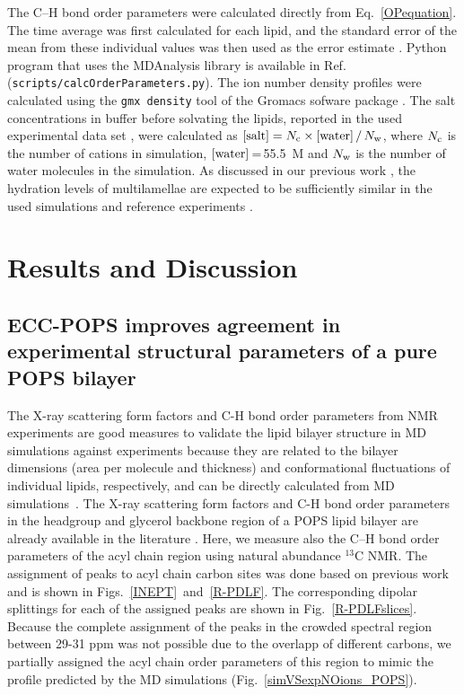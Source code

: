 \documentclass[journal=jpcbfk,manuscript=article]{achemso}
\begin{document}
The C--H bond order parameters were calculated directly from Eq.~\ref{OPequation}.
The time average was first calculated for each lipid, and
the standard error of the mean from these individual values was then used as the
error estimate \cite{botan15,ollila16,NMRlipidsIV}.
Python program that uses the
MDAnalysis library \cite{agrawal11,gowers16} is available in Ref.~ ({\tt scripts/calcOrderParameters.py}). 
The ion number density profiles were calculated using the {\tt gmx density} tool
of the Gromacs sofware package \cite{gromacsMANUAL}.
The salt concentrations in buffer before solvating the lipids, reported in the used experimental data set \cite{roux90},
were calculated as $[{\rm salt}]=N_{\rm c} \times[{\rm water}]\,/\,N_{\rm w}$,
where $N_{\rm c}$ is the number of cations in simulation, $[{\rm water}]$\,=\,55.5~M and $N_{\rm w}$
is the number of water molecules in the simulation.
As discussed in our previous work \cite{NMRlipidsIV}, the hydration levels of
multilamellae are expected to be sufficiently similar in the used simulations and reference experiments \cite{roux90}.


\section{Results and Discussion} 
 
\subsection{ECC-POPS improves agreement in experimental structural parameters of a pure POPS bilayer } 
 
The X-ray scattering form factors and C-H bond order parameters from NMR experiments are good measures to validate
the lipid bilayer structure in MD simulations against experiments because they
are related to the bilayer dimensions (area per molecule and thickness) and
conformational fluctuations of individual lipids, respectively, and 
can be directly calculated from MD simulations~\cite{ollila16}.
The X-ray scattering form factors and C-H bond order parameters in
the headgroup and glycerol backbone region of a POPS lipid bilayer are already available in the literature \cite{kucerka14,NMRlipidsIV}.
Here, we measure also the C--H bond order parameters of the acyl chain region using natural abundance $^{13}$C NMR.
The assignment of peaks to acyl chain carbon sites was done based on previous work {\cite{ferreira13}} and is shown in Figs.~\ref{INEPT}~and~\ref{R-PDLF}. The corresponding dipolar splittings for each of the assigned peaks are shown in Fig.~\ref{R-PDLFslices}. Because the complete assignment of the peaks in the crowded spectral region between 29-31 ppm was not possible due to the overlapp of different carbons, we partially assigned the acyl chain order parameters of this region to mimic the profile predicted by the MD simulations (Fig.~\ref{simVSexpNOions_POPS}).
\end{document}
